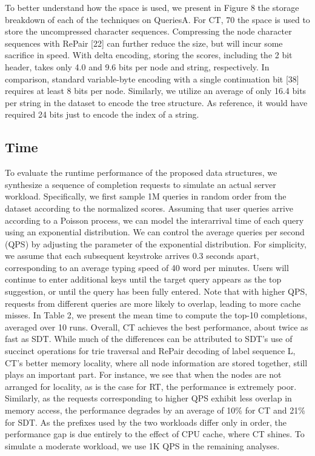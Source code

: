\documentclass{sig-alternate}
\begin{document}
To better understand how the space is used, we present
in Figure 8 the storage breakdown of each of the techniques
on QueriesA. For CT, 70  the space is used to store the
uncompressed character sequences. Compressing the node
character sequences with RePair [22] can further reduce the
size, but will incur some sacrifice in speed. With delta encoding,
storing the scores, including the 2 bit header, takes
only 4.0 and 9.6 bits per node and string, respectively. In
comparison, standard variable-byte encoding with a single
continuation bit [38] requires at least 8 bits per node. Similarly,
we utilize an average of only 16.4 bits per string in the
dataset to encode the tree structure. As reference, it would
have required 24 bits just to encode the index of a string.

\subsection{Time}

To evaluate the runtime performance of the proposed data
structures, we synthesize a sequence of completion requests
to simulate an actual server workload. Specifically, we first
sample 1M queries in random order from the dataset according
to the normalized scores. Assuming that user queries
arrive according to a Poisson process, we can model the interarrival
time of each query using an exponential distribution.
We can control the average queries per second (QPS) by
adjusting the  parameter of the exponential distribution.
For simplicity, we assume that each subsequent keystroke
arrives 0.3 seconds apart, corresponding to an average typing
speed of 40 word per minutes. Users will continue to enter
additional keys until the target query appears as the top
suggestion, or until the query has been fully entered. Note
that with higher QPS, requests from different queries are
more likely to overlap, leading to more cache misses.
In Table 2, we present the mean time to compute the top-10
completions, averaged over 10 runs. Overall, CT achieves the
best performance, about twice as fast as SDT. While much
of the differences can be attributed to SDT's use of succinct
operations for trie traversal and RePair decoding of label
sequence L, CT's better memory locality, where all node
information are stored together, still plays an important
part. For instance, we see that when the nodes are not
arranged for locality, as is the case for RT, the performance
is extremely poor. Similarly, as the requests corresponding
to higher QPS exhibit less overlap in memory access, the
performance degrades by an average of 10\% for CT and 21\%
for SDT. As the prefixes used by the two workloads differ only
in order, the performance gap is due entirely to the effect
of CPU cache, where CT shines. To simulate a moderate
workload, we use 1K QPS in the remaining analyses.
\end{document}

